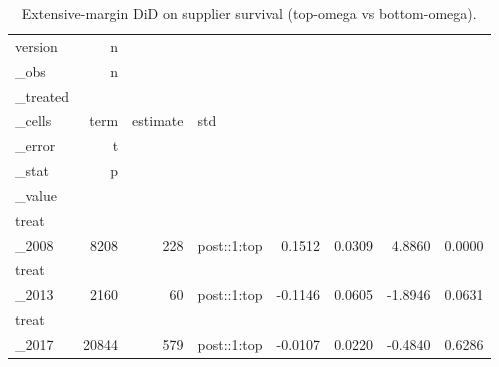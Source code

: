 \begin{table}[ht]
\centering
\caption{Extensive-margin DiD on supplier survival (top-omega vs bottom-omega).} 
\begin{tabular}{lrrlrrrr}
  \toprule
version & n\\_obs & n\\_treated\\_cells & term & estimate & std\\_error & t\\_stat & p\\_value \\ 
  \midrule
treat\\_2008 &  8208 &   228 & post::1:top & 0.1512 & 0.0309 & 4.8860 & 0.0000 \\ 
  treat\\_2013 &  2160 &    60 & post::1:top & -0.1146 & 0.0605 & -1.8946 & 0.0631 \\ 
  treat\\_2017 & 20844 &   579 & post::1:top & -0.0107 & 0.0220 & -0.4840 & 0.6286 \\ 
   \bottomrule
\end{tabular}
\end{table}
